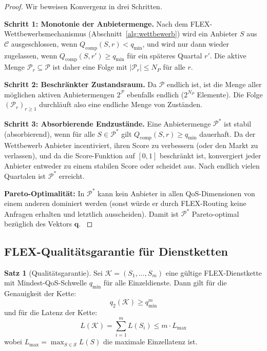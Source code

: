 ﻿\documentclass[a4paper,12pt]{article}
\theoremstyle{definition}
\newtheorem{satz}{Satz}
\begin{document}
\begin{proof}
Wir beweisen Konvergenz in drei Schritten.

\textbf{Schritt 1: Monotonie der Anbietermenge.} Nach dem FLEX-Wettbewerbsmechanismus (Abschnitt~\ref{alg:wettbewerb}) wird ein Anbieter $S$ aus $\mathcal{C}$ ausgeschlossen, wenn $Q_\mathrm{comp}(S, r) < q_\mathrm{min}$, und wird nur dann wieder zugelassen, wenn $Q_\mathrm{comp}(S, r') \geq q_\mathrm{min}$ für ein späteres Quartal $r'$. Die aktive Menge $\mathcal{P}_r \subseteq \mathcal{P}$ ist daher eine Folge mit $|\mathcal{P}_r| \leq N_P$ für alle $r$.

\textbf{Schritt 2: Beschränkter Zustandsraum.} Da $\mathcal{P}$ endlich ist, ist die Menge aller möglichen aktiven Anbietermengen $2^{\mathcal{P}}$ ebenfalls endlich ($2^{N_P}$ Elemente). Die Folge $(\mathcal{P}_r)_{r \geq 1}$ durchläuft also eine endliche Menge von Zuständen.

\textbf{Schritt 3: Absorbierende Endzustände.} Eine Anbietermenge $\mathcal{P}^*$ ist stabil (absorbierend), wenn für alle $S \in \mathcal{P}^*$ gilt $Q_\mathrm{comp}(S, r) \geq q_\mathrm{min}$ dauerhaft. Da der Wettbewerb Anbieter incentiviert, ihren Score zu verbessern (oder den Markt zu verlassen), und da die Score-Funktion auf $[0,1]$ beschränkt ist, konvergiert jeder Anbieter entweder zu einem stabilen Score oder scheidet aus. Nach endlich vielen Quartalen ist $\mathcal{P}^*$ erreicht.

\textbf{Pareto-Optimalität:} In $\mathcal{P}^*$ kann kein Anbieter in allen QoS-Dimensionen von einem anderen dominiert werden (sonst würde er durch FLEX-Routing keine Anfragen erhalten und letztlich ausscheiden). Damit ist $\mathcal{P}^*$ Pareto-optimal bezüglich des Vektors $\mathbf{q}$. $
$
\end{proof}

\subsection{FLEX-Qualitätsgarantie für Dienstketten}

\begin{satz}[Qualitätsgarantie]
\label{satz:qualitaet}
Sei $\mathcal{K} = (S_1, \ldots, S_m)$ eine gültige FLEX-Dienstkette mit Mindest-QoS-Schwelle $q_\mathrm{min}$ für alle Einzeldienste. Dann gilt für die Genauigkeit der Kette:
\[
    q_2(\mathcal{K}) \geq q_\mathrm{min}^m
\]
und für die Latenz der Kette:
\[
    L(\mathcal{K}) = \sum_{i=1}^m L(S_i) \leq m \cdot L_\mathrm{max}
\]
wobei $L_\mathrm{max} = \max_{S \in \mathcal{S}} L(S)$ die maximale Einzellatenz ist.
\end{satz}
\end{document}
